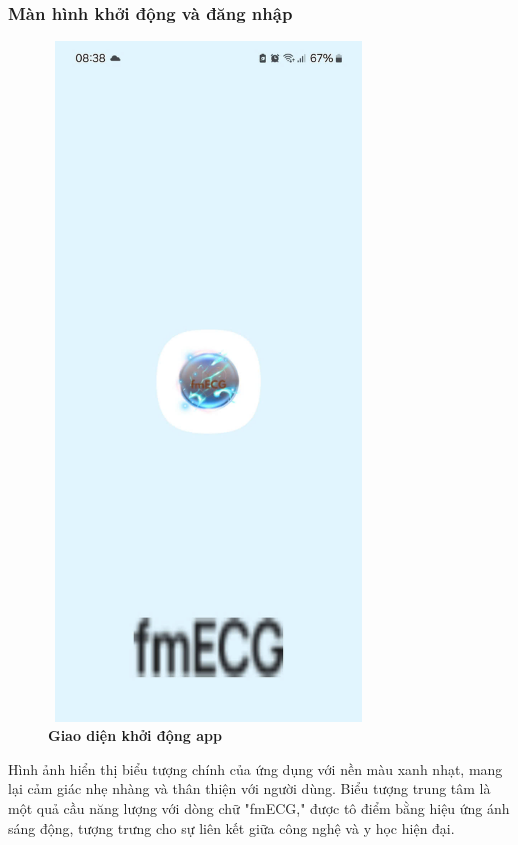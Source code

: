 \subsubsection{Màn hình khởi động và đăng nhập}

\begin{figure}[H]
	\centering
	\includegraphics[width=8.5cm,height=18cm]{Images/AppUI/startApp.jpg}
	\caption[Giao diện khởi động app]{\bfseries \fontsize{12pt}{0pt}\selectfont Giao diện khởi động app}
	\label{startApp}
\end{figure}
Hình ảnh hiển thị biểu tượng chính của ứng dụng với nền màu xanh nhạt, mang lại cảm giác nhẹ nhàng và thân thiện với người dùng. Biểu tượng trung tâm là một quả cầu năng lượng với dòng chữ "fmECG," được tô điểm bằng hiệu ứng ánh sáng động, tượng trưng cho sự liên kết giữa công nghệ và y học hiện đại.

